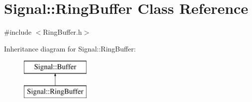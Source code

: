 \hypertarget{classSignal_1_1RingBuffer}{\section{Signal\+:\+:Ring\+Buffer Class Reference}
\label{classSignal_1_1RingBuffer}
}


{\ttfamily \#include $<$Ring\+Buffer.\+h$>$}

Inheritance diagram for Signal\+:\+:Ring\+Buffer\+:\begin{figure}[H]
\begin{center}
\leavevmode
\includegraphics[height=2.000000cm]{classSignal_1_1RingBuffer}
\end{center}
\end{figure}
